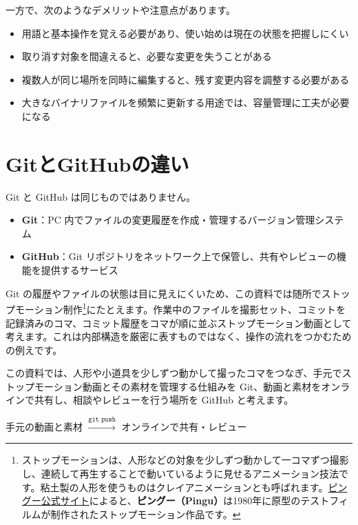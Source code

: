 \documentclass[a4paper,11pt]{jlreq}
\newcommand{\term}[1]{\textbf{#1}}
\begin{document}
一方で、次のようなデメリットや注意点があります。

\begin{itemize}
  \item 用語と基本操作を覚える必要があり、使い始めは現在の状態を把握しにくい
  \item 取り消す対象を間違えると、必要な変更を失うことがある
  \item 複数人が同じ場所を同時に編集すると、残す変更内容を調整する必要がある
  \item 大きなバイナリファイルを頻繁に更新する用途では、容量管理に工夫が必要になる
\end{itemize}

\section{GitとGitHubの違い}

Git と GitHub は同じものではありません。

\begin{itemize}
  \item \term{Git}：PC 内でファイルの変更履歴を作成・管理するバージョン管理システム
  \item \term{GitHub}：Git リポジトリをネットワーク上で保管し、共有やレビューの機能を提供するサービス
\end{itemize}

Git の履歴やファイルの状態は目に見えにくいため、この資料では随所でストップモーション制作\footnote{ストップモーションは、人形などの対象を少しずつ動かして一コマずつ撮影し、連続して再生することで動いているように見せるアニメーション技法です。粘土製の人形を使うものはクレイアニメーションとも呼ばれます。\href{https://www.pingu.jp/about/}{ピングー公式サイト}によると、\term{ピングー（Pingu）}は1980年に原型のテストフィルムが制作されたストップモーション作品です。}にたとえます。作業中のファイルを撮影セット、コミットを記録済みのコマ、コミット履歴をコマが順に並ぶストップモーション動画として考えます。これは内部構造を厳密に表すものではなく、操作の流れをつかむための例えです。

この資料では、人形や小道具を少しずつ動かして撮ったコマをつなぎ、手元でストップモーション動画とその素材を管理する仕組みを Git、動画と素材をオンラインで共有し、相談やレビューを行う場所を GitHub と考えます。

\begin{center}
手元の動画と素材 $\xrightarrow{\texttt{git push}}$
オンラインで共有・レビュー
\end{center}
\end{document}
